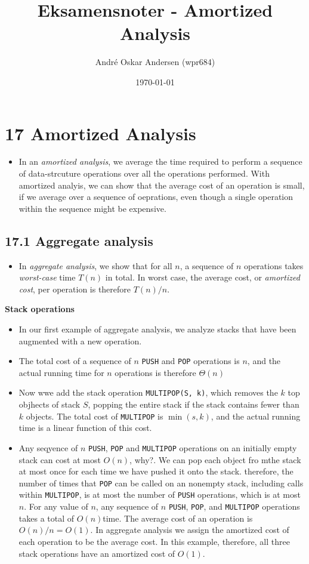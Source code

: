 \documentclass{report}
\title{Eksamensnoter - Amortized Analysis}
\author{André Oskar Andersen (wpr684)}
\date{\today}
\begin{document}
\maketitle

\section{17 Amortized Analysis}
\begin{itemize}
    \item In an \textit{amortized analysis}, we average the time required to perform a sequence of data-strcuture operations over all the operations performed. With amortized analyis, we can show that the average cost of an operation is small, if we average over a sequence of oeprations, even though a single operation within the sequence might be expensive.
\end{itemize}
\subsection*{17.1 Aggregate analysis}
\begin{itemize}
    \item In \textit{aggregate analysis}, we show that for all $n$, a sequence of $n$ operations takes \textit{worst-case} time $T(n)$ in total. In worst case, the average cost, or \textit{amortized cost}, per operation is therefore $T(n)/n$.
\end{itemize}
\textbf{Stack operations}
\begin{itemize}
    \item In our first example of aggregate analysis, we analyze stacks that have been augmented with a new operation.
    \item The total cost of a sequence of $n$ \texttt{PUSH} and \texttt{POP} operations is $n$, and the actual running time for $n$ operations is therefore $\Theta(n)$
    \item Now wwe add the stack operation \texttt{MULTIPOP(S, k)}, which removes the $k$ top objhects of stack $S$, popping the entire stack if the stack contains fewer than $k$ objects. The total cost of \texttt{MULTIPOP} is $\min(s, k)$, and the actual running time is a linear function of this cost.
    \item Any seqyence of $n$ \texttt{PUSH}, \texttt{POP} and \texttt{MULTIPOP} operations on an initially empty stack can cost at most $O(n)$, why?. We can pop each object fro mthe stack at most once for each time we have pushed it onto the stack. therefore, the number of times that \texttt{POP} can be called on an nonempty stack, including calls within \texttt{MULTIPOP}, is at most the number of \texttt{PUSH} operations, which is at most $n$. For any value of $n$, any sequence of $n$ \texttt{PUSH}, \texttt{POP}, and \texttt{MULTIPOP} operations takes a total of $O(n)$time. The average cost of an operation is $O(n)/n = O(1)$. In aggregate analysis we assign the amortized cost of each operation to be the average cost. In this example, therefore, all three stack operations have an amortized cost of $O(1)$.
\end{itemize}
\end{document}
